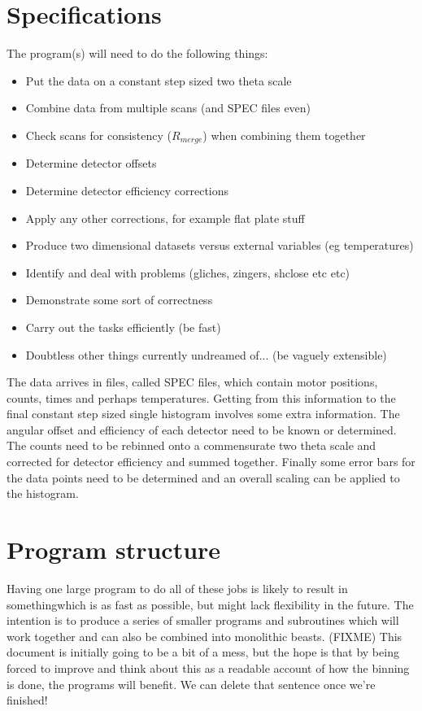 \documentclass[10pt,a4paper,notitlepage]{article}
\begin{document}
\section{Specifications}
The program(s) will need to do the following things:
\begin{itemize}
 \item Put the data on a constant step sized two theta scale
 \item Combine data from multiple scans (and SPEC files even)
 \item Check scans for consistency ($R_{merge}$) when combining them together
 \item Determine detector offsets 
 \item Determine detector efficiency corrections
 \item Apply any other corrections, for example flat plate stuff
 \item Produce two dimensional datasets versus external variables 
 (eg temperatures)
 \item Identify and deal with problems (gliches, zingers, shclose etc etc)
 \item Demonstrate some sort of correctness 
 \item Carry out the tasks efficiently (be fast)
 \item Doubtless other things currently undreamed of... (be vaguely extensible)
\end{itemize}

The data arrives in files, called SPEC files, which contain motor positions, 
counts, times and perhaps temperatures. 
Getting from this information to the final constant step sized single 
histogram involves some extra information. 
The angular offset and efficiency of each detector need to be known or
determined. 
The counts need to be rebinned onto a commensurate two theta scale 
and corrected for detector efficiency and summed together. 
Finally some error bars for the data points need to be determined and 
an overall scaling can be applied to the histogram.

\section{Program structure}

Having one large program to do all of these jobs is likely to result 
in somethingwhich is as fast as possible, but might lack flexibility 
in the future.
The intention is to produce a series of smaller programs and subroutines 
which will work together and can also be combined into monolithic beasts. 
(FIXME) This document is initially going to be a bit of a mess, but the hope 
is that by being forced to improve and think 
about this as a readable account of how the binning is done, 
the programs will benefit. 
We can delete that sentence once we're finished!
\end{document}

